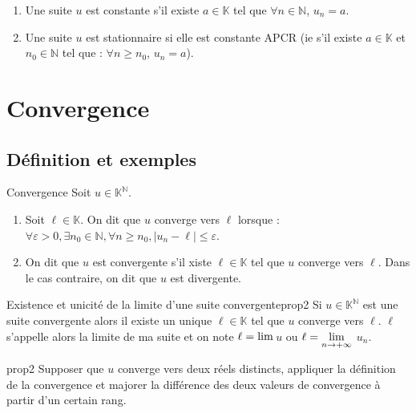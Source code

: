 \documentclass[12pt,a4paper]{report}
\begin{document}
\begin{exemple}[Exemples]
\begin{enumerate}
\item Une suite $u$ est constante s'il existe $a \in \mathbb{K}$ tel que $\forall n \in \mathbb{N}$, $u_n = a$.
\item Une suite $u$ est stationnaire si elle est constante APCR  \newline (ie s'il existe $a \in \mathbb{K}$ et $n_0 \in \mathbb{N}$ tel que : $\forall n \geq n_0$, $u_n=a$).
\end{enumerate}
\end{exemple}


\newpage

\section{Convergence}
\subsection{Définition et exemples}

\begin{definition}{Convergence}{}
Soit $u \in \mathbb{K}^\mathbb{N}$.
\begin{enumerate}
\item Soit $\ell \in \mathbb{K}$. On dit que $u$ converge vers $\ell$ lorsque : $\forall \varepsilon > 0, \exists n_0 \in \mathbb{N}, \forall n \geq n_0, \lvert u_n - \ell \rvert \leq \varepsilon$.
\item On dit que $u$ est convergente s'il xiste $\ell \in \mathbb{K}$ tel que $u$ converge vers $\ell$. Dans le cas contraire, on dit que $u$ est divergente.
\end{enumerate}
\end{definition}

\begin{proposition}{Existence et unicité de la limite d'une suite convergente}{prop2}
Si $u \in \mathbb{K}^\mathbb{N}$ est une suite convergente alors il existe un unique $\ell \in \mathbb{K}$ tel que $u$ converge vers $\ell$. $\ell$ s'appelle alors la limite de ma suite et on note $\ell = \rm{lim}$\,$u$ ou $\ell = \underset{n \rightarrow +\infty}{\rm{lim}}$ $u_n$.
\end{proposition}

\begin{principedemo}{prop2}
Supposer que $u$ converge vers deux réels distincts, appliquer la définition de la convergence et majorer la différence des deux valeurs de convergence à partir d'un certain rang.
\end{principedemo}
\end{document}
